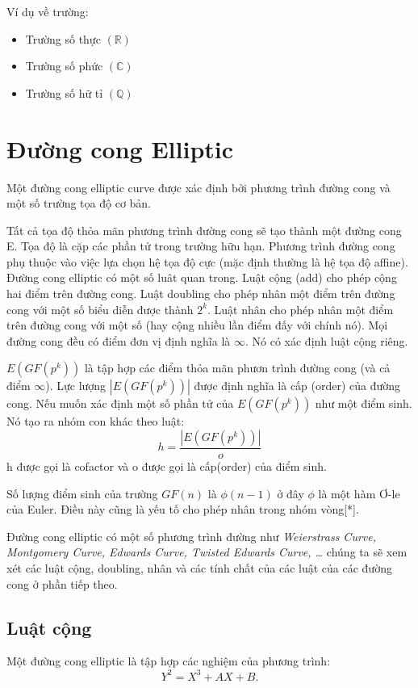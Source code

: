\documentclass[a4paper,12pt]{report}
\begin{document}
Ví dụ về trường:
\begin{itemize}
\item Trường số thực $(\mathbb{R})$
\item Trường số phức $(\mathbb{C})$
\item Trường số hữ tỉ $(\mathbb{Q})$
\end{itemize}
\section{Đường cong Elliptic}
Một đường cong elliptic curve được xác định bởi phương trình đường cong và một số trường tọa độ cơ bản.

Tất cả tọa độ thỏa mãn phương trình đường cong sẽ tạo thành một đường cong E. Tọa độ là cặp các phần tử trong trường hữu hạn. Phương trình đường cong phụ thuộc vào việc lựa chọn hệ tọa độ cực (mặc định thường là hệ tọa độ affine). Đường cong elliptic có một số luât quan trong. Luật cộng (add) cho phép cộng hai điểm trên đường cong. Luật doubling cho phép nhân một điểm trên đường cong với một số biểu diễn được thành $2^k$. Luật nhân cho phép nhân một điểm trên đường cong với một số (hay cộng nhiều lần điểm đấy với chính nó). Mọi đường cong đều có điểm đơn vị định nghĩa là $\infty$. Nó có xác định luật cộng riêng.

$E(GF(p^k))$ là tập hợp các điểm thỏa mãn phươn trình đường cong (và cả điểm $\infty$). Lực lượng $|E(GF(p^k))|$ được định nghĩa là cấp (order) của đường cong. Nếu muốn xác định một số phần tử của 
$E(GF(p^k))$ như một điểm sinh. Nó tạo ra nhóm con khác theo luật:
\begin{displaymath}
h = \frac{|E(GF(p^k))|}{o}
\end{displaymath}
h được gọi là cofactor và o được gọi là cấp(order) của điểm sinh.

Số lượng điểm sinh của trường $GF(n)$ là $\phi (n - 1)$ ở đây $\phi$ là một hàm Ơ-le của Euler. Điều này cũng là yếu tố cho phép nhân trong nhóm vòng[*].

Đường cong elliptic có một số phương trình đường như \textit{Weierstrass Curve, Montgomery Curve, Edwards Curve, Twisted Edwards Curve, \ldots } chúng ta sẽ xem xét các luật cộng, doubling, nhân và các tính chất của các luật của các đường cong ở phần tiếp theo.
 \subsection*{Luật cộng}
Một đường cong elliptic là tập hợp các nghiệm của phương trình:
\begin{displaymath}
Y^2 = X^3 + AX + B.
\end{displaymath}
\end{document}
